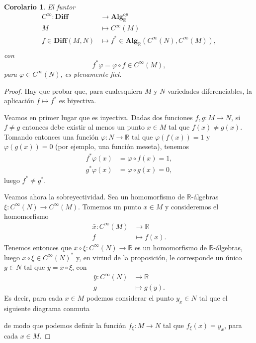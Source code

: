 \documentclass[12pt,a4paper]{book}
\newtheorem{corol}[thm]{Corolario}
\theoremstyle{definition} \newtheorem{defn}[thm]{Definición}
\theoremstyle{definition} \newtheorem{ejemplo}[thm]{Ejemplo}
\theoremstyle{definition} \newtheorem{ejercicio}[thm]{Ejercicio}
\theoremstyle{remark} \newtheorem*{obs}{Observación}
\def\RR{\mathbb{R}}
\begin{document}
\begin{corol}
  El funtor
  \begin{align*}
    C^{\infty}:\mathbf{Diff} &\longrightarrow  \mathbf{Alg}_\RR^{op}\\ 
    M &\longmapsto  C^{\infty}(M)\\
    f\in \mathbf{Diff}(M,N) &\longmapsto  f^{*}\in \mathbf{Alg}_\RR(C^{\infty}(N),C^{\infty}(M)),\\
    \end{align*}
    con
    \begin{equation*}
      f^*\varphi=\varphi \circ f \in C^{\infty}(M),
    \end{equation*}
    para $\varphi \in C^{\infty}(N)$, es plenamente fiel.
  \end{corol}
\begin{proof}
  Hay que probar que, para cualesquiera $M$ y $N$ variedades diferenciables, la aplicación $f\mapsto f^*$ es biyectiva. 

  Veamos en primer lugar que es inyectiva. Dadas dos funciones $f,g:M\rightarrow N$, si $f\neq g$ entonces debe existir al menos un punto $x\in M$ tal que $f(x)\neq g(x)$. Tomando entonces una función $\varphi:N\rightarrow \RR$ tal que $\varphi(f(x))=1$ y $\varphi(g(x))=0$ (por ejemplo, una función meseta), tenemos
  \begin{align*}
    f^*\varphi (x)&= \varphi \circ f (x) = 1, \\
    g^*\varphi (x)&= \varphi \circ g (x) = 0,
  \end{align*}
  luego $f^* \neq g^*$.

  Veamos ahora la sobreyectividad. Sea un homomorfismo de $\RR$-álgebras $\xi:C^{\infty}(N)\rightarrow C^{\infty}(M)$. Tomemos un punto $x\in M$ y consideremos el homomorfismo 
  \begin{align*}
    \bar{x} :C^{\infty}(M)&\longrightarrow \RR\\ 
      f &\longmapsto f(x). 
    \end{align*}
    Tenemos entonces que $\bar{x} \circ \xi: C^{\infty}(N) \rightarrow \RR$ es un homomorfismo de $\RR$-álgebras, luego $\bar{x}\circ \xi \in C^{\infty}(N)^*$ y, en virtud de la proposición, le corresponde un único $y \in N$ tal que $\bar{y}=\bar{x} \circ \xi$, con 
  \begin{align*}
    \bar{y} :C^{\infty}(N)&\longrightarrow \RR\\ 
      g &\longmapsto g(y). 
    \end{align*}
    Es decir, para cada $x \in M$ podemos considerar el punto $y_x \in N$ tal que el siguiente diagrama conmuta
    \begin{center}
     \end{center}
     de modo que podemos definir la función $f_{\xi}:M\rightarrow N$ tal que $f_{\xi}(x)=y_x$, para cada $x\in M$.

\end{proof}
\end{document}
